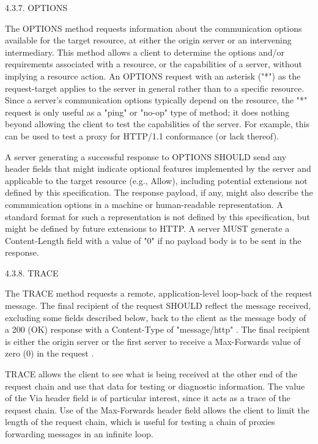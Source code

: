     
    4.3.7.  OPTIONS
    
       The OPTIONS method requests information about the communication
       options available for the target resource, at either the origin
       server or an intervening intermediary.  This method allows a client
       to determine the options and/or requirements associated with a
       resource, or the capabilities of a server, without implying a
       resource action.
       An OPTIONS request with an asterisk ("*") as the request-target
    applies to the server in general rather
   than to a specific resource.  Since a server's communication options
   typically depend on the resource, the "*" request is only useful as a
   "ping" or "no-op" type of method; it does nothing beyond allowing the
   client to test the capabilities of the server.  For example, this can
   be used to test a proxy for HTTP/1.1 conformance (or lack thereof).

  
   A server generating a successful response to OPTIONS SHOULD send any
   header fields that might indicate optional features implemented by
   the server and applicable to the target resource (e.g., Allow),
   including potential extensions not defined by this specification.
   The response payload, if any, might also describe the communication
   options in a machine or human-readable representation.  A standard
   format for such a representation is not defined by this
   specification, but might be defined by future extensions to HTTP.  A
   server MUST generate a Content-Length field with a value of "0" if no
   payload body is to be sent in the response.

4.3.8.  TRACE

   The TRACE method requests a remote, application-level loop-back of
   the request message.  The final recipient of the request SHOULD
   reflect the message received, excluding some fields described below,
   back to the client as the message body of a 200 (OK) response with a
   Content-Type of "message/http" .  The
   final recipient is either the origin server or the first server to
   receive a Max-Forwards value of zero (0) in the request
  .

   TRACE allows the client to see what is being received at the other
   end of the request chain and use that data for testing or diagnostic
   information.  The value of the Via header field  is of particular interest, since it acts as a trace of the
   request chain.  Use of the Max-Forwards header field allows the
   client to limit the length of the request chain, which is useful for
   testing a chain of proxies forwarding messages in an infinite loop.



